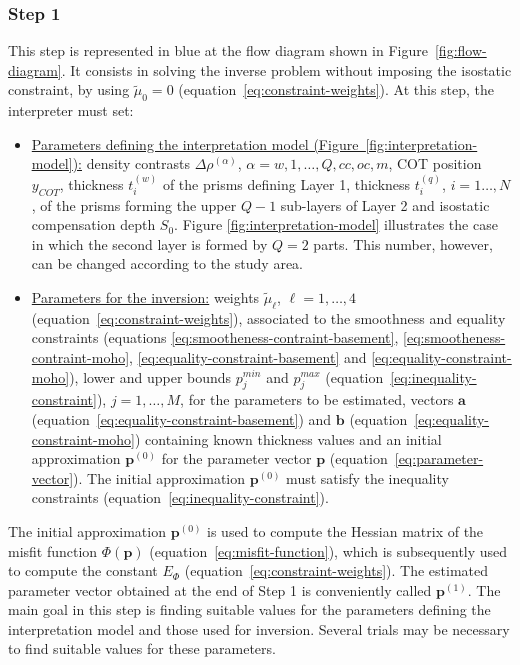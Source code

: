 \documentclass[manuscript,revised]{geophysics}
\begin{document}
\subsubsection{Step 1}

This step is represented in blue at the flow diagram shown in 
Figure~\ref{fig:flow-diagram}.
It consists in solving the inverse problem without imposing 
the isostatic constraint, by using $\tilde{\mu}_{0} = 0$ 
(equation~\ref{eq:constraint-weights}). 
At this step, the interpreter must set:
\begin{itemize}
	\item \underline{Parameters defining the interpretation model
	(Figure~\ref{fig:interpretation-model}):} density contrasts $\Delta \rho^{(\alpha)}$, 
	$\alpha = w, 1, \dots, Q, cc, oc, m$, COT position $y_{COT}$, thickness $t^{(w)}_{i}$ 
	of the prisms defining Layer 1, thickness $t^{(q)}_{i}$, $i = 1 \dots, N$, of the prisms
	forming the upper $Q-1$ sub-layers of Layer 2 and isostatic compensation depth $S_{0}$. 
	Figure \ref{fig:interpretation-model} illustrates 
	the case in which the second layer is formed by $Q = 2$ parts. This number, however, 
	can be changed according to the study area.
	\item \underline{Parameters for the inversion:} weights $\tilde{\mu}_{\ell}$,
	$\ell = 1, \dots, 4$ (equation~\ref{eq:constraint-weights}), associated to the 
	smoothness and equality constraints (equations 
	\ref{eq:smootheness-contraint-basement}, \ref{eq:smootheness-contraint-moho},
	\ref{eq:equality-constraint-basement} and \ref{eq:equality-constraint-moho}),
	lower and upper bounds $p_{j}^{min}$ and $p_{j}^{max}$
	(equation~\ref{eq:inequality-constraint}), $j = 1, \dots, M$,
	for the parameters to be estimated, vectors $\mathbf{a}$ 
	(equation~\ref{eq:equality-constraint-basement}) and $\mathbf{b}$
	(equation~\ref{eq:equality-constraint-moho}) containing known thickness values
	and an initial approximation $\mathbf{p}^{(0)}$ for the parameter vector $\mathbf{p}$
	(equation~\ref{eq:parameter-vector}). The initial approximation $\mathbf{p}^{(0)}$
	must satisfy the inequality constraints (equation~\ref{eq:inequality-constraint}).
\end{itemize}

The initial approximation $\mathbf{p}^{(0)}$ is used to compute the 
Hessian matrix of the misfit function $\Phi(\mathbf{p})$ (equation~\ref{eq:misfit-function}),
which is subsequently used to compute the constant $E_{\Phi}$ (equation~\ref{eq:constraint-weights}).
The estimated parameter vector obtained at the end of Step 1 is conveniently called
$\mathbf{p}^{(1)}$. The main goal in this step is finding suitable values for the parameters
defining the interpretation model and those used for inversion. Several trials may be
necessary to find suitable values for these parameters.
\end{document}
